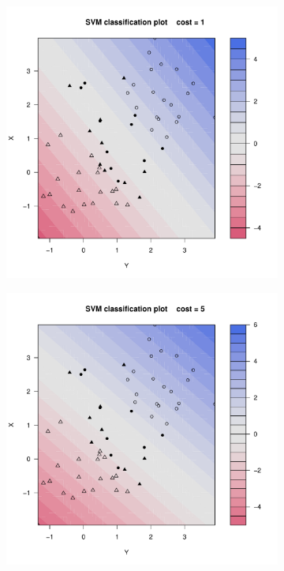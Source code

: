 \begin{figure}[H]
\begin{subfigure}{0.24\linewidth}
		\includegraphics[width=1\linewidth]{Graphics/Problema_01/Experiment_01_2.pdf}
		\caption{}
	\end{subfigure}
	\begin{subfigure}{0.24\linewidth}
		\includegraphics[width=1\linewidth]{Graphics/Problema_01/Experiment_01_3.pdf}

\end{subfigure}
\end{figure}
